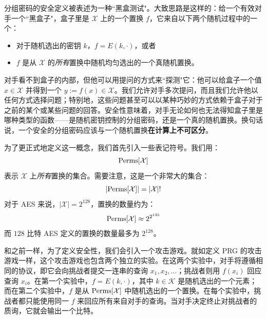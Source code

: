 分组密码的安全定义被表述为一种``黑盒测试"。大致思路是这样的：给一个有效对手一个``黑盒子"，盒子里是 $\mathcal{X}$ 上的一个置换 $f$，它来自以下两个随机过程中的一个：
\begin{itemize}
	\item 对于随机选出的密钥 $k$，$f=E(k,\cdot)$，或者
	\item $f$ 是从 $\mathcal{X}$ 的\emph{所有}置换中随机均匀选出的一个真随机置换。
\end{itemize}
对手看不到盒子的内部，但他可以用提问的方式来``探测"它：他可以给盒子一个值 $x\in\mathcal{X}$ 并得到一个 $y:=f(x)\in\mathcal{X}$。我们允许对手多次提问，而且我们允许他以任何方式选择问题；特别地，这些问题甚至可以以某种巧妙的方式依赖于盒子对于之前的某个或某些问题的回答。安全性意味着，对手无论如何也无法得知盒子里是哪种类型的函数——是随机密钥控制的分组密码，还是一个真的随机置换。换句话说，一个安全的分组密码应该与一个随机置换\textbf{在计算上不可区分}。

为了更正式地定义这一概念，我们首先引入一些表记符号。我们用：
\[
{\rm Perms}[\mathcal{X}]
\]
表示 $\mathcal{X}$ 上\emph{所有}置换的集合。需要注意，这是一个非常大的集合：
\[
|{\rm Perms}[\mathcal{X}]|=|\mathcal{X}|!
\]
对于 AES 来说，$|\mathcal{X}|=2^{128}$，置换的数量约为：
\[
{\rm Perms}[\mathcal{X}]\approx 2^{2^{135}}
\]
而 $128$ 比特 AES 定义的置换的数量最多为 $2^{128}$。

和之前一样，为了定义安全性，我们会引入一个攻击游戏。就如定义 PRG 的攻击游戏一样，这个攻击游戏也包含两个独立的实验。在这两个实验中，对手将遵循相同的协议，即它会向挑战者提交一连串的查询 $x_1,x_2,\dots$；挑战者则用 $f(x_i)$ 回应查询 $x_i$。在第一个实验中，$f=E(k,\cdot)$，其中 $k\in\mathcal{K}$ 是随机选出的一个元素；而在第二个实验中，$f$ 是从 ${\rm Perms}[\mathcal{X}]$ 中随机选出的一个置换。在每个实验中，挑战者都只能使用同一 $f$ 来回应所有来自对手的查询。当对手决定终止对挑战者的质询，它就会输出一个比特。

